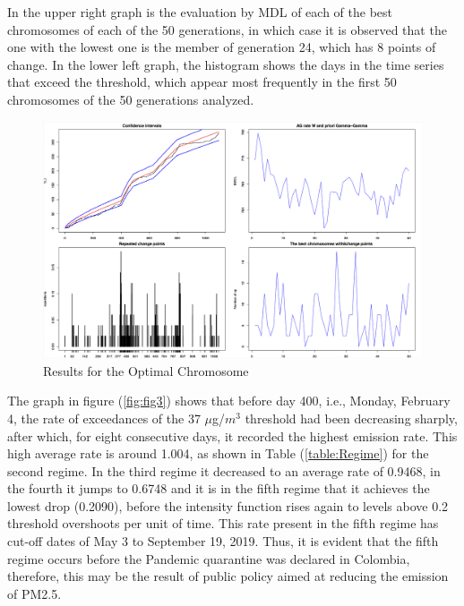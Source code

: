 \documentclass[APA,STIX1COL]{WileyNJD-v2}
\begin{document}
In the upper right graph is the evaluation by MDL of each of the best chromosomes of each of the 50 generations, in which case it is observed that the one with the lowest one is the member of generation 24, which has 8 points of change. In the lower left graph, the histogram shows the days in the time series that exceed the threshold, which appear most frequently in the first 50 chromosomes of the 50 generations analyzed.


\begin{figure}[h]
\begin{center}
\includegraphics[width=16cm]{Fourgraph.png}
\end{center}
\caption{Results for the Optimal Chromosome}
\label{fig:fig2}
\end{figure}




The graph in figure (\ref{fig:fig3}) shows that before day 400, i.e., Monday, February 4, the rate of exceedances of the 37 $\mu$g/$m^3$ threshold had been decreasing sharply, after which, for eight consecutive days, it recorded the highest emission rate. This high average rate is around 1.004, as shown in Table (\ref{table:Regime}) for the second regime. In the third regime it decreased to an average rate of 0.9468, in the fourth it jumps to 0.6748 and it is in the fifth regime that it achieves the lowest drop (0.2090), before the intensity function rises again to levels above 0.2 threshold overshoots per unit of time. This  rate present in the fifth regime has cut-off dates of May 3 to September 19, 2019. Thus, it is evident that the fifth regime occurs before the Pandemic quarantine was declared in Colombia, therefore, this may be the result of public policy aimed at reducing the emission of PM2.5.
\end{document}
